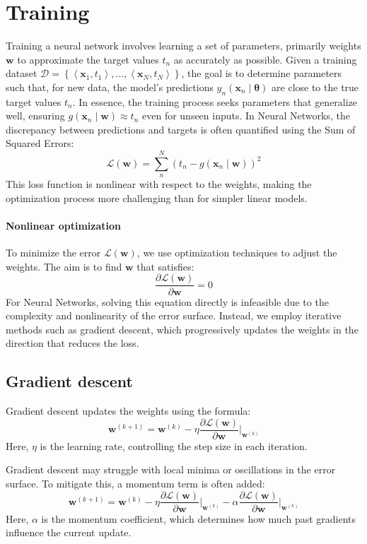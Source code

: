 \section{Training}

Training a neural network involves learning a set of parameters, primarily weights $\mathbf{w}$ to approximate the target values $t_n$ as accurately as possible.
Given a training dataset $\mathcal{D}=\left\{\left\langle \mathbf{x}_1,t_1 \right\rangle,\dots,\left\langle \mathbf{x}_N,t_N\right\rangle\right\}$, the goal is to determine parameters such that, for new data, the model's predictions $y_n(\mathbf{x}_n\mid\boldsymbol{\theta})$ are close to the true target values $t_n$.
In essence, the training process seeks parameters that generalize well, ensuring $g(\mathbf{x}_n\mid\mathbf{w})\approx t_n$ even for unseen inputs.
In Neural Networks, the discrepancy between predictions and targets is often quantified using the Sum of Squared Errors:
\[\mathcal{L}(\mathbf{w})=\sum_n^N\left(t_n-g(\mathbf{x}_n\mid\mathbf{w})\right)^2\]
This loss function is nonlinear with respect to the weights, making the optimization process more challenging than for simpler linear models.

\paragraph*{Nonlinear optimization}
To minimize the error $\mathcal{L}(\mathbf{w})$, we use optimization techniques to adjust the weights. 
The aim is to find $\mathbf{w}$ that satisfies:
\[\dfrac{\partial \mathcal{L}(\mathbf{w})}{\partial \mathbf{w}}=0\]
For Neural Networks, solving this equation directly is infeasible due to the complexity and nonlinearity of the error surface. 
Instead, we employ iterative methods such as gradient descent, which progressively updates the weights in the direction that reduces the loss.

\subsection{Gradient descent}
Gradient descent updates the weights using the formula:
\[\mathbf{w}^{(k+1)}=\mathbf{w}^{(k)}-\eta\dfrac{\partial \mathcal{L}(\mathbf{w})}{\partial \mathbf{w}}\Bigg|_{\mathbf{w}^{(k)}}\]
Here, $\eta$ is the learning rate, controlling the step size in each iteration. 

Gradient descent may struggle with local minima or oscillations in the error surface. 
To mitigate this, a momentum term is often added:
\[\mathbf{w}^{(k+1)}=\mathbf{w}^{(k)}-\eta\dfrac{\partial \mathcal{L}(\mathbf{w})}{\partial \mathbf{w}}\Bigg|_{\mathbf{w}^{(k)}}-\alpha\dfrac{\partial \mathcal{L}(\mathbf{w})}{\partial \mathbf{w}}\Bigg|_{\mathbf{w}^{(k)}}\]
Here, $\alpha$ is the momentum coefficient, which determines how much past gradients influence the current update. 

